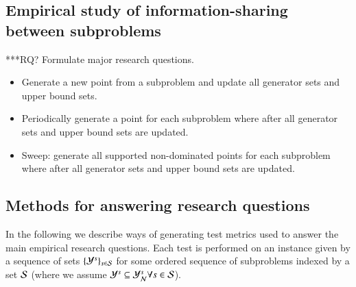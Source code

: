 \subsection{Empirical study of information-sharing between subproblems}
***RQ? Formulate major research questions.

\begin{itemize}
	\item 
Generate a new point from a subproblem and update all generator sets and upper bound sets.
	\item 
Periodically generate a point for each subproblem where after all generator sets and upper bound sets are updated.
	\item 
Sweep: generate all supported non-dominated points for each subproblem where after all generator sets and upper bound sets are updated.
\end{itemize}



\subsection{Methods for answering research questions}

In the following we describe ways of generating test metrics used to answer the main empirical research questions. Each test is performed on an \msp instance given by a sequence of sets $\{\Y^s\}_{s \in \S}$ for some ordered sequence of subproblems indexed by a set $\S$ (where we assume $\Y^s \subseteq \Yn^s \forall s \in \S$).

